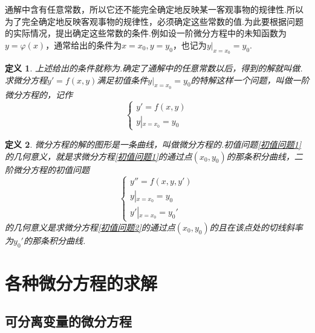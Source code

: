 \documentclass[12pt,a4paper]{book}
\numberwithin{equation}{section}
\newtheorem{defination}{\hspace*{0.3cm}\color{dy}\FiveFlowerOpen \hspace*{0.2cm}定义}[section]
\begin{document}
\hspace*{0.6cm}通解中含有任意常数，所以它还不能完全确定地反映某一客观事物的规律性.所以为了完全确定地反映客观事物的规律性，必须确定这些常数的值.为此要根据问题的实际情况，提出确定这些常数的条件.例如设一阶微分方程中的未知函数为$y=\varphi (x)$，通常给出的条件为$x=x_0,y=y_0$，也记为${y|}_{x=x_0}=y_0$.

\begin{defination}
    \hspace*{0.3cm}上述给出的条件就称为.确定了通解中的任意常数以后，得到的解就叫做.求微分方程$y'=f(x ,y)$满足初值条件${y|}_{x=x_0}=y_0$的特解这样一个问题，叫做一阶微分方程的，记作
    \begin{equation}
        \left\lbrace
        \begin{array}{l}
            y' = f(x,y) \\
            y\left | {_{x = {x_0}} = {y_0}} \right.
        \end{array}
        \right.
        \label{初值问题1}
    \end{equation}
\end{defination}

\begin{defination}
    微分方程的解的图形是一条曲线，叫做微分方程的.初值问题\eqref{初值问题1}的几何意义，就是求微分方程\eqref{初值问题1}的通过点$(x_0,y_0)$的那条积分曲线，二阶微分方程的初值问题
    \begin{equation}
        \left\lbrace
        \begin{array}{l}
            y''= f(x,y,y')                          \\
            y\left | {_{x = {x_0}} = {y_0}} \right. \\
            y'\left | {_{x = {x_0}} = {y_0'}} \right.
        \end{array}
        \right.
        \label{初值问题2}
    \end{equation}
    的几何意义是求微分方程\eqref{初值问题2}的通过点$(x_0,y_0)$的且在该点处的切线斜率为$y_0'$的那条积分曲线.
\end{defination}

\section{各种微分方程的求解}
\subsection{可分离变量的微分方程}
\end{document}
